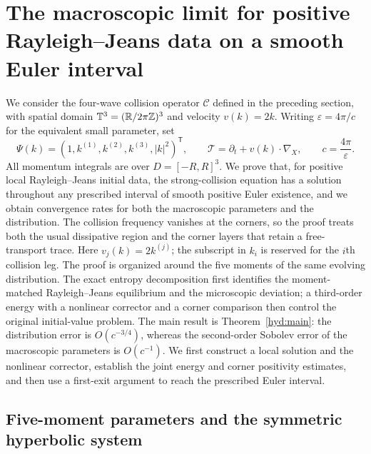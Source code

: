 \section{The macroscopic limit for positive Rayleigh--Jeans data on a smooth \texorpdfstring{\mbox{Euler}}{Euler} interval}
\label{hyd:section}

We consider the four-wave collision operator $\mathcal C$ defined in the
preceding section, with spatial domain $\mathbb T^3=(\mathbb R/2\pi\mathbb Z)^3$ and
velocity $v(k)=2k$. Writing $\varepsilon=4\pi/c$ for the equivalent small
parameter, set
\[
 \Psi(k)=(1,k^{(1)},k^{(2)},k^{(3)},|k|^2)^{\mathsf T},\qquad
 \mathcal T=\partial_t+v(k)\cdot\nabla_X,
 \qquad c=\frac{4\pi}{\varepsilon}.
\]
All momentum integrals are over $D=[-R,R]^3$. We prove that, for positive
local Rayleigh--Jeans initial data, the strong-collision equation has a
solution throughout any prescribed interval of smooth positive Euler
existence, and we obtain convergence rates for both the macroscopic
parameters and the distribution. The collision frequency vanishes at the
corners, so the proof treats both the usual dissipative region and the
corner layers that retain a free-transport trace. Here $v_j(k)=2k^{(j)}$;
the subscript in $k_i$ is reserved for the $i$th collision leg.
The proof is organized around the five moments of the same evolving
distribution. The exact entropy decomposition first identifies the
moment-matched Rayleigh--Jeans equilibrium and the microscopic deviation;
a third-order energy with a nonlinear corrector and a corner comparison
then control the original initial-value problem. The main result is
Theorem~\ref{hyd:main}: the distribution error is $O(c^{-3/4})$, whereas
the second-order Sobolev error of the macroscopic parameters is $O(c^{-1})$.
We first construct a local solution and the nonlinear corrector, establish
the joint energy and corner positivity estimates, and then use a
first-exit argument to reach the prescribed Euler interval.

\subsection{Five-moment parameters and the symmetric hyperbolic system}
\label{hyd:euler-section}

